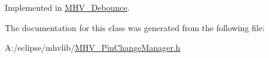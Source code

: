 Implemented in \hyperlink{class_m_h_v___debounce_abe77ae67fb3b94307edf52ddeaf768da}{M\-H\-V\-\_\-\-Debounce}.



The documentation for this class was generated from the following file\-:\begin{DoxyCompactItemize}
\item 
A\-:/eclipse/mhvlib/\hyperlink{_m_h_v___pin_change_manager_8h}{M\-H\-V\-\_\-\-Pin\-Change\-Manager.\-h}\end{DoxyCompactItemize}
